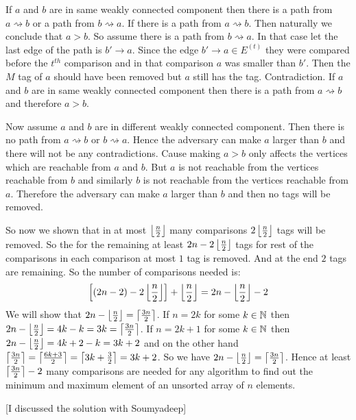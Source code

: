 \documentclass[a4paper, 11pt]{article}
\begin{document}
{If $a$ and $b$ are in same weakly connected component then there is a path from $a\rightsquigarrow b$ or a path from $b\rightsquigarrow a$. If there is a path from $a\rightsquigarrow b$. Then naturally we conclude that $a>b$. So assume there is a path from $b\rightsquigarrow a$. In that case let the last edge of the path is $b'\to a$. Since the edge $b'\to a\in E^{(t)}$ they were compared before the $t^{th}$ comparison and in that comparison $a$ was smaller than $b'$. Then the $M$ tag of $a$ should have been removed but $a$ still has the tag. Contradiction. If $a$ and $b$ are in same weakly connected component then there is a path from $a\rightsquigarrow b$ and therefore $a>b$.

Now assume $a$ and $b$ are in different weakly connected component. Then there is no path from $a\rightsquigarrow b$ or $b\rightsquigarrow a$. Hence the adversary can make $a$ larger than $b$ and there will not be any contradictions. Cause making $a>b$ only affects the vertices which are reachable from $a$ and $b$. But $a$ is not reachable from the vertices reachable from $b$ and similarly $b$ is not reachable from the vertices reachable from $a$. Therefore the adversary can make $a$ larger than $b$ and then no tags will be removed.

So now we shown that in at most $\left\lfloor \frac{n}2\right\rfloor$ many comparisons $2\left\lfloor \frac{n}2\right\rfloor$ tags will be removed. So the for the remaining at least $2n-2\left\lfloor \frac{n}2\right\rfloor$ tags for rest of the comparisons in each comparison at most $1$ tag is removed. And at the end $2$ tags are remaining. So the number of comparisons needed is:$$\left[(2n-2)-2\left\lfloor \frac{n}2\right\rfloor\right]+\left\lfloor \frac{n}2\right\rfloor=2n-\left\lfloor \frac{n}2\right\rfloor-2$$We will show that $2n-\left\lfloor \frac{n}2\right\rfloor=\left\lceil\frac{3n}2\right\rceil$. If $n=2k$ for some $k\in\mathbb{N}$ then $2n-\left\lfloor \frac{n}2\right\rfloor=4k-k=3k=\left\lceil \frac{3n}2\right\rceil$. If $n=2k+1$ for some $k\in\mathbb{N}$ then $2n-\left\lfloor \frac{n}2\right\rfloor=4k+2-k=3k+2$ and on the other hand $ \left\lceil \frac{3n}2\right\rceil=\left\lceil \frac{6k+3}{2}\right\rceil=\left\lceil3k+\frac32\right\rceil=3k+2$. So we have $2n-\left\lfloor \frac{n}2\right\rfloor=\left\lceil\frac{3n}2\right\rceil$. Hence at least $\left\lceil\frac{3n}2\right\rceil-2$ many comparisons are needed for any algorithm to find out the minimum and maximum element of an unsorted array of $n$ elements.
}\parinf

[I discussed the solution with Soumyadeep]

\end{document}
